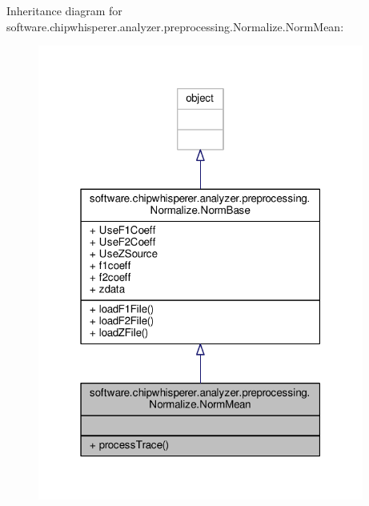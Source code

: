 Inheritance diagram for software.\+chipwhisperer.\+analyzer.\+preprocessing.\+Normalize.\+Norm\+Mean\+:\nopagebreak
\begin{figure}[H]
\begin{center}
\leavevmode
\includegraphics[width=304pt]{da/d9b/classsoftware_1_1chipwhisperer_1_1analyzer_1_1preprocessing_1_1Normalize_1_1NormMean__inherit__graph}
\end{center}
\end{figure}


